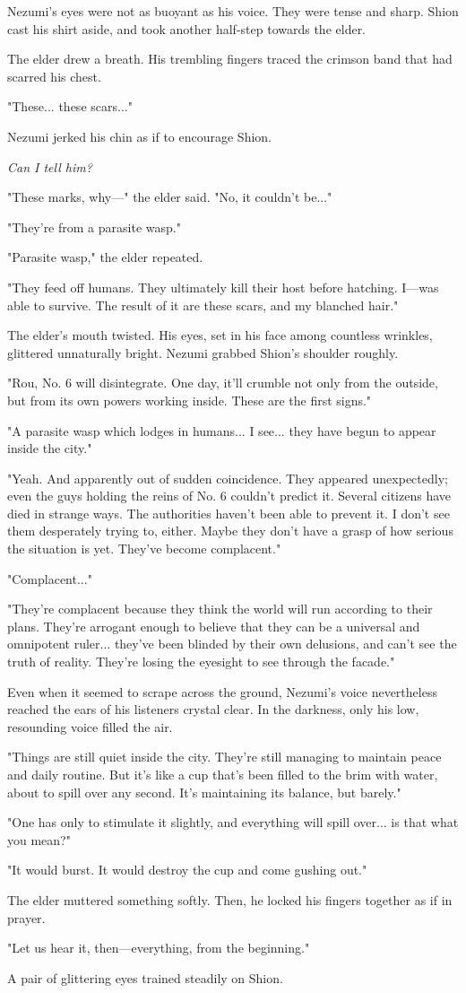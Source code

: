 Nezumi's eyes were not as buoyant as his voice. They were tense and
sharp. Shion cast his shirt aside, and took another half-step towards
the elder.

The elder drew a breath. His trembling fingers traced the crimson band
that had scarred his chest.

"These... these scars..."

Nezumi jerked his chin as if to encourage Shion.

\emph{Can I tell him?}

"These marks, why---" the elder said. "No, it couldn't be..."

"They're from a parasite wasp."

"Parasite wasp," the elder repeated.

"They feed off humans. They ultimately kill their host before hatching.
I---was able to survive. The result of it are these scars, and my blanched
hair."

The elder's mouth twisted. His eyes, set in his face among countless
wrinkles, glittered unnaturally bright. Nezumi grabbed Shion's shoulder
roughly.

"Rou, No. 6 will disintegrate. One day, it'll crumble not only from the
outside, but from its own powers working inside. These are the first
signs."

"A parasite wasp which lodges in humans... I see... they have begun to
appear inside the city."

"Yeah. And apparently out of sudden coincidence. They appeared
unexpectedly; even the guys holding the reins of No. 6 couldn't predict
it. Several citizens have died in strange ways. The authorities haven't
been able to prevent it. I don't see them desperately trying to, either.
Maybe they don't have a grasp of how serious the situation is yet.
They've become complacent."

"Complacent..."

"They're complacent because they think the world will run according to
their plans. They're arrogant enough to believe that they can be a
universal and omnipotent ruler... they've been blinded by their own
delusions, and can't see the truth of reality. They're losing the
eyesight to see through the facade."

Even when it seemed to scrape across the ground, Nezumi's voice
nevertheless reached the ears of his listeners crystal clear. In the
darkness, only his low, resounding voice filled the air.

"Things are still quiet inside the city. They're still managing to
maintain peace and daily routine. But it's like a cup that's been filled
to the brim with water, about to spill over any second. It's maintaining
its balance, but barely."

"One has only to stimulate it slightly, and everything will spill
over... is that what you mean?"

"It would burst. It would destroy the cup and come gushing out."

The elder muttered something softly. Then, he locked his fingers
together as if in prayer.

"Let us hear it, then---everything, from the beginning."

A pair of glittering eyes trained steadily on Shion.